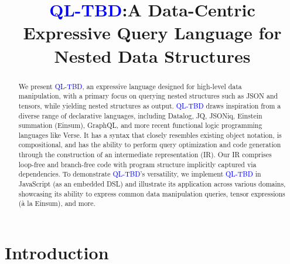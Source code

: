 \documentclass[runningheads]{llncs}
\newcommand{\lang}{\textcolor{blue}{QL-TBD}}
\begin{document}
%
\title{\lang{}:A Data-Centric Expressive Query Language for Nested Data Structures}

%
%
%
\maketitle              %
%
\begin{abstract}
We present \lang{}, an expressive language designed for high-level data manipulation,
with a primary focus on querying nested structures such as JSON and tensors,
while yielding nested structures as output.
\lang{} draws inspiration from a diverse range of declarative languages,
including Datalog, JQ, JSONiq, Einstein summation (Einsum), GraphQL, and more
recent functional logic programming languages like Verse.
It has a syntax that closely resembles existing object notation,
is compositional, and has the ability to perform query optimization and
code generation through the construction of an intermediate
representation (IR).
Our IR comprises loop-free and branch-free code with program structure
implicitly captured via dependencies.
To demonstrate \lang{}'s versatility, 
we implement \lang{} in JavaScript (as an embedded DSL) and 
illustrate its application
across various domains, showcasing its ability to express common
data manipulation queries, tensor expressions (à la Einsum), and more.

\end{abstract}
%
%
%
\section{Introduction}\label{sec:intro}

\end{document}
